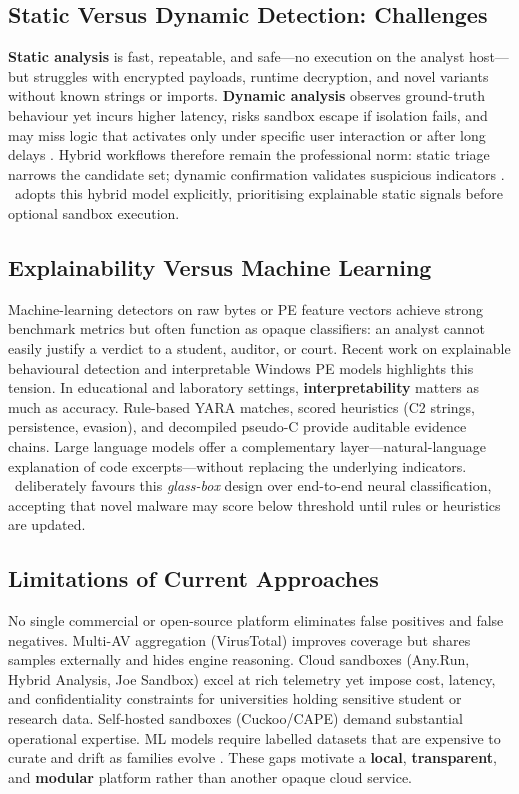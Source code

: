 \subsection{Static Versus Dynamic Detection: Challenges}

\textbf{Static analysis} is fast, repeatable, and safe---no execution on the analyst host---but
struggles with encrypted payloads, runtime decryption, and novel variants without known strings or
imports. \textbf{Dynamic analysis} observes ground-truth behaviour yet incurs higher latency, risks
sandbox escape if isolation fails, and may miss logic that activates only under specific user
interaction or after long delays \cite{cipriano2019,moser2007,alrawi2024}. Hybrid workflows therefore remain
the professional norm: static triage narrows the candidate set; dynamic confirmation validates
suspicious indicators \cite{bensaoud2024}. \rat\ adopts this hybrid model explicitly, prioritising explainable static
signals before optional sandbox execution.

\subsection{Explainability Versus Machine Learning}

Machine-learning detectors on raw bytes or PE feature vectors achieve strong benchmark metrics
\cite{raff2018,ucar2020,apruzzese2018,khan2024} but often function as opaque classifiers: an analyst
cannot easily justify a verdict to a student, auditor, or court. Recent work on explainable
behavioural detection \cite{galli2024} and interpretable Windows PE models \cite{khan2024,imran2024}
highlights this tension. In educational and laboratory settings, \textbf{interpretability} matters
as much as accuracy. Rule-based YARA matches, scored
heuristics (C2 strings, persistence, evasion), and decompiled pseudo-C provide auditable
evidence chains. Large language models offer a complementary layer---natural-language explanation
of code excerpts---without replacing the underlying indicators. \rat\ deliberately favours this
\emph{glass-box} design over end-to-end neural classification, accepting that novel malware may
score below threshold until rules or heuristics are updated.

\subsection{Limitations of Current Approaches}

No single commercial or open-source platform eliminates false positives and false negatives.
Multi-AV aggregation (VirusTotal) improves coverage but shares samples externally and hides
engine reasoning. Cloud sandboxes (Any.Run, Hybrid Analysis, Joe Sandbox) excel at rich telemetry
yet impose cost, latency, and confidentiality constraints for universities holding sensitive
student or research data. Self-hosted sandboxes (Cuckoo/CAPE) demand substantial operational
expertise. ML models require labelled datasets that are expensive to curate and drift as families
evolve \cite{vinod2019,mohaisen2016,imran2024}. These gaps motivate a \textbf{local}, \textbf{transparent},
and \textbf{modular} platform rather than another opaque cloud service.

